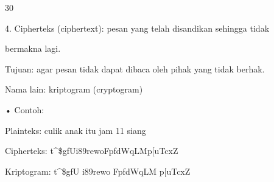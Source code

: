 \documentclass{article}
\begin{document}

30

4.  Cipherteks (ciphertext): pesan yang telah disandikan sehingga tidak 

bermakna lagi.

      Tujuan: agar pesan tidak dapat dibaca oleh pihak yang tidak berhak.

      Nama lain: kriptogram (cryptogram)

• Contoh:

 Plainteks:  culik anak itu jam 11 siang

 Cipherteks: t\textasciicircum{}\$gfUi89rewoFpfdWqLMp[uTcxZ

 Kriptogram: t\textasciicircum{}\$gfU  i89rewo  FpfdWqLM  p[uTcxZ
\end{document}
